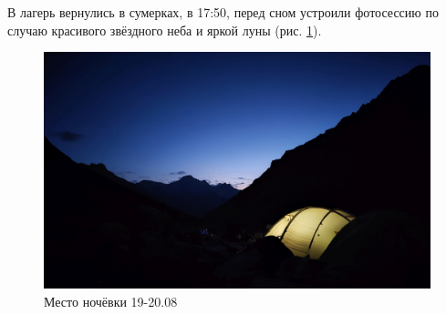 В лагерь вернулись в сумерках, в 17:50, перед сном устроили фотосессию по случаю красивого звёздного неба и яркой луны (рис. \ref{fig:IMG_20240829_194851}).

\begin{figure}[h!]
	\centering
	\includegraphics[width=0.7\linewidth]{../pics/IMG_20240829_194851}
	\caption{Место ночёвки 19-20.08}
	\label{fig:IMG_20240829_194851}
\end{figure}

\clearpage